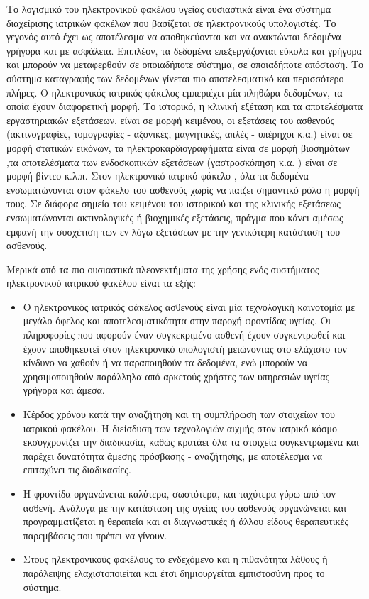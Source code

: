 		Το λογισμικό του ηλεκτρονικού φακέλου υγείας ουσιαστικά είναι ένα σύστημα διαχείρισης ιατρικών φακέλων που βασίζεται σε ηλεκτρονικούς υπολογιστές. Το γεγονός αυτό έχει ως αποτέλεσμα να αποθηκεύονται και να ανακτώνται δεδομένα γρήγορα και με ασφάλεια. Επιπλέον, τα δεδομένα επεξεργάζονται εύκολα και γρήγορα και μπορούν να μεταφερθούν σε οποιαδήποτε σύστημα, σε οποιαδήποτε απόσταση. Το σύστημα καταγραφής των δεδομένων γίνεται πιο αποτελεσματικό και περισσότερο πλήρες. Ο ηλεκτρονικός ιατρικός φάκελος εμπεριέχει μία πληθώρα δεδομένων, τα οποία έχουν διαφορετική μορφή\cite{Makoul2001}. Το ιστορικό, η κλινική εξέταση και τα αποτελέσματα εργαστηριακών εξετάσεων, είναι σε μορφή κειμένου, οι εξετάσεις του ασθενούς (ακτινογραφίες, τομογραφίες - αξονικές, μαγνητικές, απλές - υπέρηχοι κ.α.) είναι σε μορφή στατικών εικόνων, τα ηλεκτροκαρδιογραφήματα είναι σε μορφή βιοσημάτων ,τα αποτελέσματα των ενδοσκοπικών εξετάσεων (γαστροσκόπηση κ.α. ) είναι σε μορφή βίντεο κ.λ.π.  Στον ηλεκτρονικό ιατρικό φάκελο , όλα τα δεδομένα ενσωματώνονται στον φάκελο του ασθενούς χωρίς να παίζει σημαντικό ρόλο η μορφή τους. Σε διάφορα σημεία του κειμένου του ιστορικού και της κλινικής εξετάσεως ενσωματώνονται ακτινολογικές ή βιοχημικές εξετάσεις, πράγμα που κάνει αμέσως εμφανή την συσχέτιση των εν λόγω εξετάσεων με την γενικότερη κατάσταση του ασθενούς.

Μερικά από τα πιο ουσιαστικά πλεονεκτήματα της χρήσης ενός συστήματος ηλεκτρονικού ιατρικού φακέλου είναι τα εξής\cite{MenachemiNFAUMenachemi}\cite{McLANE2005}:
	
\begin{itemize}

\item Ο ηλεκτρονικός ιατρικός φάκελος ασθενούς είναι μία τεχνολογική καινοτομία με μεγάλο όφελος και αποτελεσματικότητα στην παροχή φροντίδας υγείας. Οι πληροφορίες που αφορούν έναν συγκεκριμένο ασθενή έχουν συγκεντρωθεί και έχουν αποθηκευτεί στον ηλεκτρονικό υπολογιστή μειώνοντας στο ελάχιστο τον κίνδυνο να χαθούν ή να παραποιηθούν τα δεδομένα, ενώ μπορούν να χρησιμοποιηθούν παράλληλα από αρκετούς χρήστες των υπηρεσιών υγείας γρήγορα και άμεσα. 

\item Κέρδος χρόνου κατά την αναζήτηση και τη συμπλήρωση των στοιχείων του ιατρικού φακέλου. Η διείσδυση των τεχνολογιών αιχμής στον ιατρικό κόσμο εκσυγχρονίζει την διαδικασία, καθώς κρατάει όλα τα στοιχεία συγκεντρωμένα και παρέχει δυνατότητα άμεσης πρόσβασης - αναζήτησης, με αποτέλεσμα να επιταχύνει τις διαδικασίες.

\item Η φροντίδα οργανώνεται καλύτερα, σωστότερα, και ταχύτερα γύρω από τον ασθενή. Ανάλογα με την κατάσταση της υγείας του ασθενούς οργανώνεται και προγραμματίζεται η θεραπεία και οι διαγνωστικές ή άλλου είδους θεραπευτικές παρεμβάσεις που πρέπει να γίνουν.

\item Στους ηλεκτρονικούς φακέλους το ενδεχόμενο και η πιθανότητα λάθους ή παράλειψης ελαχιστοποιείται και έτσι δημιουργείται εμπιστοσύνη προς το σύστημα.

\end{itemize}


